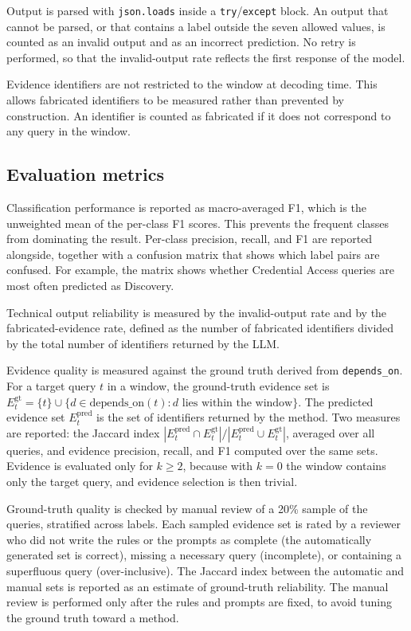 \documentclass[12pt,a4paper]{report}
\begin{document}
Output is parsed with \texttt{json.loads} inside a \texttt{try}/\texttt{except} block. An output that cannot be parsed, or that contains a label outside the seven allowed values, is counted as an invalid output and as an incorrect prediction. No retry is performed, so that the invalid-output rate reflects the first response of the model.

Evidence identifiers are not restricted to the window at decoding time. This allows fabricated identifiers to be measured rather than prevented by construction. An identifier is counted as fabricated if it does not correspond to any query in the window.

\subsection{Evaluation metrics}
\label{sec:metrics}
Classification performance is reported as macro-averaged F1, which is the unweighted mean of the per-class F1 scores. This prevents the frequent classes from dominating the result. Per-class precision, recall, and F1 are reported alongside, together with a confusion matrix that shows which label pairs are confused. For example, the matrix shows whether Credential Access queries are most often predicted as Discovery.

Technical output reliability is measured by the invalid-output rate and by the fabricated-evidence rate, defined as the number of fabricated identifiers divided by the total number of identifiers returned by the LLM.

Evidence quality is measured against the ground truth derived from \texttt{depends\_on}. For a target query $t$ in a window, the ground-truth evidence set is $E^{\text{gt}}_t = \{t\} \cup \{d \in \text{depends\_on}(t) : d \text{ lies within the window}\}$. The predicted evidence set $E^{\text{pred}}_t$ is the set of identifiers returned by the method. Two measures are reported: the Jaccard index $|E^{\text{pred}}_t \cap E^{\text{gt}}_t| / |E^{\text{pred}}_t \cup E^{\text{gt}}_t|$, averaged over all queries, and evidence precision, recall, and F1 computed over the same sets. Evidence is evaluated only for $k \geq 2$, because with $k = 0$ the window contains only the target query, and evidence selection is then trivial.

Ground-truth quality is checked by manual review of a 20\% sample of the queries, stratified across labels. Each sampled evidence set is rated by a reviewer who did not write the rules or the prompts as complete (the automatically generated set is correct), missing a necessary query (incomplete), or containing a superfluous query (over-inclusive). The Jaccard index between the automatic and manual sets is reported as an estimate of ground-truth reliability. The manual review is performed only after the rules and prompts are fixed, to avoid tuning the ground truth toward a method.
\end{document}
